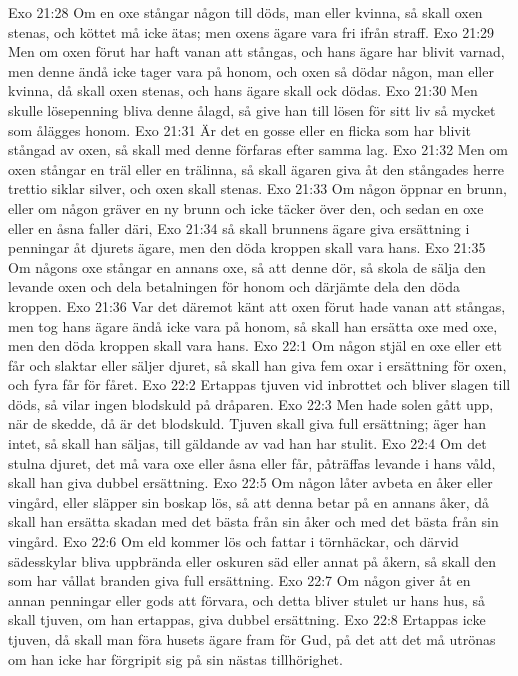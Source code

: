 Exo 21:28  Om en oxe stångar någon till döds, man eller kvinna, så skall oxen stenas, och köttet må icke ätas; men oxens ägare vara fri ifrån straff.
Exo 21:29  Men om oxen förut har haft vanan att stångas, och hans ägare har blivit varnad, men denne ändå icke tager vara på honom, och oxen så dödar någon, man eller kvinna, då skall oxen stenas, och hans ägare skall ock dödas.
Exo 21:30  Men skulle lösepenning bliva denne ålagd, så give han till lösen för sitt liv så mycket som ålägges honom.
Exo 21:31  Är det en gosse eller en flicka som har blivit stångad av oxen, så skall med denne förfaras efter samma lag.
Exo 21:32  Men om oxen stångar en träl eller en trälinna, så skall ägaren giva åt den stångades herre trettio siklar silver, och oxen skall stenas.
Exo 21:33  Om någon öppnar en brunn, eller om någon gräver en ny brunn och icke täcker över den, och sedan en oxe eller en åsna faller däri,
Exo 21:34  så skall brunnens ägare giva ersättning i penningar åt djurets ägare, men den döda kroppen skall vara hans.
Exo 21:35  Om någons oxe stångar en annans oxe, så att denne dör, så skola de sälja den levande oxen och dela betalningen för honom och därjämte dela den döda kroppen.
Exo 21:36  Var det däremot känt att oxen förut hade vanan att stångas, men tog hans ägare ändå icke vara på honom, så skall han ersätta oxe med oxe, men den döda kroppen skall vara hans.
Exo 22:1  Om någon stjäl en oxe eller ett får och slaktar eller säljer djuret, så skall han giva fem oxar i ersättning för oxen, och fyra får för fåret.
Exo 22:2  Ertappas tjuven vid inbrottet och bliver slagen till döds, så vilar ingen blodskuld på dråparen.
Exo 22:3  Men hade solen gått upp, när de skedde, då är det blodskuld. Tjuven skall giva full ersättning; äger han intet, så skall han säljas, till gäldande av vad han har stulit.
Exo 22:4  Om det stulna djuret, det må vara oxe eller åsna eller får, påträffas levande i hans våld, skall han giva dubbel ersättning.
Exo 22:5  Om någon låter avbeta en åker eller vingård, eller släpper sin boskap lös, så att denna betar på en annans åker, då skall han ersätta skadan med det bästa från sin åker och med det bästa från sin vingård.
Exo 22:6  Om eld kommer lös och fattar i törnhäckar, och därvid sädesskylar bliva uppbrända eller oskuren säd eller annat på åkern, så skall den som har vållat branden giva full ersättning.
Exo 22:7  Om någon giver åt en annan penningar eller gods att förvara, och detta bliver stulet ur hans hus, så skall tjuven, om han ertappas, giva dubbel ersättning.
Exo 22:8  Ertappas icke tjuven, då skall man föra husets ägare fram för Gud, på det att det må utrönas om han icke har förgripit sig på sin nästas tillhörighet.
